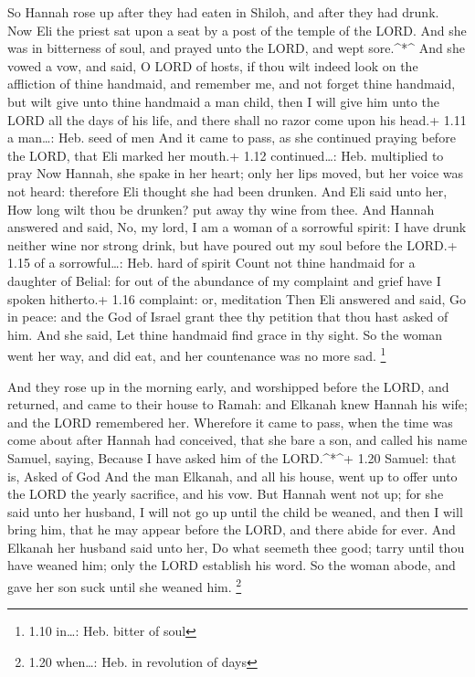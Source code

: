  So Hannah rose up after they had eaten in Shiloh, and after
they had drunk. Now Eli the priest sat upon a seat by a post of the
temple of the LORD.  And she was in bitterness of soul, and
prayed unto the LORD, and wept sore.\^{}*\^{}  And she
vowed a vow, and said, O LORD of hosts, if thou wilt indeed look on the
affliction of thine handmaid, and remember me, and not forget thine
handmaid, but wilt give unto thine handmaid a man child, then I will
give him unto the LORD all the days of his life, and there shall no
razor come upon his head.+ 1.11 a man\ldots: Heb. seed of men
 And it came to pass, as she continued praying before the
LORD, that Eli marked her mouth.+ 1.12 continued\ldots: Heb. multiplied
to pray  Now Hannah, she spake in her heart; only her lips
moved, but her voice was not heard: therefore Eli thought she had been
drunken.  And Eli said unto her, How long wilt thou be
drunken? put away thy wine from thee.  And Hannah answered
and said, No, my lord, I am a woman of a sorrowful spirit: I have drunk
neither wine nor strong drink, but have poured out my soul before the
LORD.+ 1.15 of a sorrowful\ldots: Heb. hard of spirit 
Count not thine handmaid for a daughter of Belial: for out of the
abundance of my complaint and grief have I spoken hitherto.+ 1.16
complaint: or, meditation  Then Eli answered and said, Go
in peace: and the God of Israel grant thee thy petition that thou hast
asked of him.  And she said, Let thine handmaid find grace
in thy sight. So the woman went her way, and did eat, and her
countenance was no more sad. \footnote{1.10 in\ldots: Heb. bitter of
  soul}

 And they rose up in the morning early, and worshipped
before the LORD, and returned, and came to their house to Ramah: and
Elkanah knew Hannah his wife; and the LORD remembered her. 
Wherefore it came to pass, when the time was come about after Hannah had
conceived, that she bare a son, and called his name Samuel, saying,
Because I have asked him of the LORD.\^{}*\^{}+ 1.20 Samuel: that is,
Asked of God  And the man Elkanah, and all his house, went
up to offer unto the LORD the yearly sacrifice, and his vow.
 But Hannah went not up; for she said unto her husband, I
will not go up until the child be weaned, and then I will bring him,
that he may appear before the LORD, and there abide for ever.
 And Elkanah her husband said unto her, Do what seemeth
thee good; tarry until thou have weaned him; only the LORD establish his
word. So the woman abode, and gave her son suck until she weaned him.
\footnote{1.20 when\ldots: Heb. in revolution of days}

